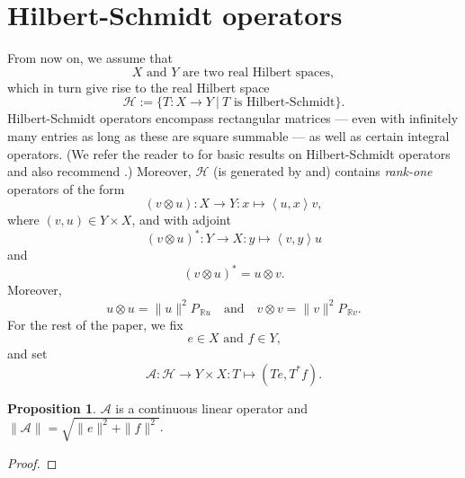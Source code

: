 \documentclass[12pt]{article}
\newcommand{\menge}[2]{\big\{{#1}~\big |~{#2}\big\}}
\newcommand{\scal}[2]{\left\langle{#1},{#2}  \right\rangle}
\newcommand{\RR}{\ensuremath{\mathbb R}}
\theoremstyle{definition}
\newtheorem{proposition}[theorem]{Proposition}
\providecommand{\RR}{\mathbb{R}}
\providecommand{\RR}{\mathbb{R}}
\providecommand{\mA}{\mathcal{A}}
\begin{document}
{\section{Hilbert-Schmidt operators}

\label{sec:main}

From now on, we assume that 
\begin{equation}
\text{
$X$ and $Y$ are 
two real Hilbert spaces},
\end{equation}
which in turn give rise to the real Hilbert space 
\begin{equation}
\mathcal{H} := 
\menge{T\colon X\to Y}{\text{$T$ is Hilbert-Schmidt}}.
\end{equation} 
{  
Hilbert-Schmidt operators encompass rectangular matrices 
--- even with infinitely many entries as long as these are
square summable --- as well as certain integral operators.}
(We refer the reader to 
\cite[Section~2.6]{KadiRing1} for basic results
on Hilbert-Schmidt operators
{ 
and also recommend \cite[Section~VI.6]{ReedSimon}.})
{ 
Moreover,}
$\mathcal{H}$ (is generated by and) contains
{\it rank-one} operators of the form 
\begin{equation}
(v\otimes u)\colon X \to Y \colon x\mapsto \scal{u}{x}v, 
\end{equation}
where $(v,u)\in Y\times X$, and with adjoint
\begin{equation}
\label{e:210413a}
(v\otimes u)^*\colon Y \to X \colon y\mapsto \scal{v}{y}u
\end{equation}
and 
\begin{equation}
\label{e:210419a}
(v\otimes u)^*=u\otimes v.
\end{equation}
Moreover,
\begin{equation}
\label{e:210419b}
u\otimes u = \|u\|^2P_{\,\RR u}
\quad\text{and}\quad
v\otimes v = \|v\|^2P_{\,\RR v}. 
\end{equation}
For the rest of the paper, we fix 
\begin{equation}
\text{$e\in X$ and $f \in Y$,}
\end{equation}
and set 
\begin{equation}
\label{e:defA}
\mathcal{A}
\colon \mathcal{H}\to  Y\times X
\colon T \mapsto (Te,T^*f).
\end{equation}
{ 
\begin{proposition}
$\mathcal{A}$ is a continuous linear operator
and 
$\displaystyle \|\mA\| = \sqrt{\|e\|^2+\|f\|^2}$. 
\end{proposition}
\begin{proof}

\end{proof}}}
\end{document}
